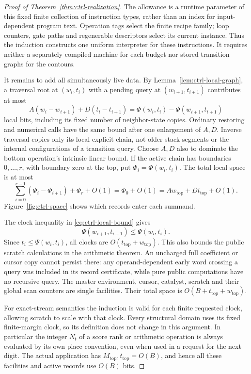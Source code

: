 \begin{proof}[Proof of Theorem~\ref{thm:ctrl-realization}]
The allowance is a runtime parameter of this fixed finite collection of
instruction types, rather than an index for input-dependent program
text.  Operation tags select the finite recipe family; loop counters,
gate paths and regenerable descriptors select its current instance.
Thus the induction constructs one uniform interpreter for these
instructions.  It requires neither a separately compiled machine for
each budget nor stored transition graphs for the contours.

It remains to add all simultaneously live data.  By
Lemma~\ref{lem:ctrl-local-graph}, a traversal root at $(w_i,t_i)$ with a
pending query at $(w_{i+1},t_{i+1})$ contributes at most
\begin{equation}\label{eq:ctrl-stack-segment}
 A(w_i-w_{i+1})+D(t_i-t_{i+1})
 =\Phi(w_i,t_i)-\Phi(w_{i+1},t_{i+1})
\end{equation}
local bits, including its fixed number of neighbor-state copies.
Ordinary restoring and numerical calls have the same bound after one
enlargement of $A,D$.  Inverse traversal copies only its local explicit
chain, not older stack segments or the internal configurations of a
transition query.  Choose $A,D$ also to dominate the bottom operation's
intrinsic linear bound.  If the active chain has boundaries
$0,\ldots,r$, with boundary zero at the top, put
$\Phi_i=\Phi(w_i,t_i)$.  The total local space is at most
\[
 \sum_{i=0}^{r-1}(\Phi_i-\Phi_{i+1})+\Phi_r+O(1)
 =\Phi_0+O(1)
 =Aw_{\mathrm{top}}+Dt_{\mathrm{top}}+O(1).
\]
Figure~\ref{fig:ctrl-space} shows which records enter each summand.



The clock inequality in \eqref{eq:ctrl-local-bound} gives
\begin{equation}\label{eq:ctrl-clock-invariant}
 \Psi(w_{i+1},t_{i+1})\le\Psi(w_i,t_i).
\end{equation}
Since $t_i\le\Psi(w_i,t_i)$, all clocks are
$O(t_{\mathrm{top}}+w_{\mathrm{top}})$.
This also bounds the public scratch calculations in the arithmetic
theorem.  An uncharged full coefficient or cursor copy cannot persist
there: any operand-dependent early word crossing a query was included
in its record certificate, while pure public computations have no
recursive query.  The master environment, cursor, catalyst, scratch
and their global scan counters are single facilities.  Their total
space is $O(B+t_{\mathrm{top}}+w_{\mathrm{top}})$.

For exact-stream semantics the induction is valid for each finite
requested clock, allowing scratch to scale with that clock.  Every
structural domain uses its fixed finite-margin clock, so its definition
does not change in this argument.  In particular the integer $N_t$ of a
score rank or arithmetic operation is always evaluated by its own
place convention, even when used in a request for the next digit.
The actual application has $M_{\mathrm{top}},t_{\mathrm{top}}=O(B)$,
and hence all these facilities and active records use $O(B)$ bits.
\end{proof}
